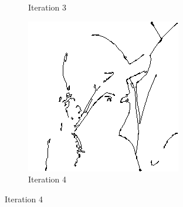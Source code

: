 \documentclass{llncs}
\begin{document}
\begin{figure}
\begin{subfigure}[b]{0.3\textwidth}
                \caption{Iteration 3}
                \label{fig:heu_iter3}
        \end{subfigure}
        \quad
        \begin{subfigure}[b]{0.3\textwidth}
                \includegraphics[width=\textwidth]{IMG/HeuristicInit/Iteration4}
                \caption{Iteration 4}
                \label{fig:heu_iter4}
        \end{subfigure}
        
        \vspace{5mm}
        

\end{figure}
\end{document}
